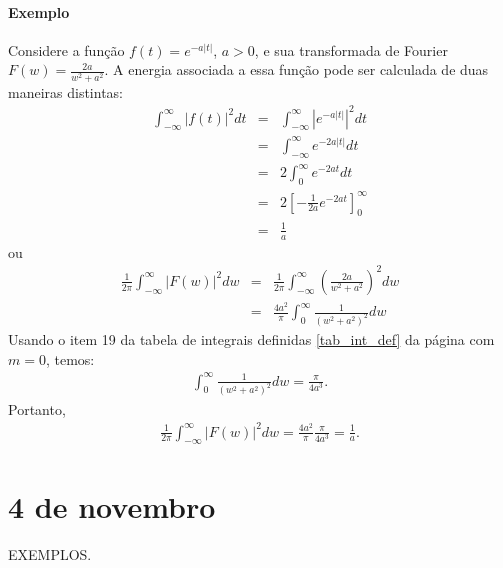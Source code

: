 \documentclass[a4paper,10pt]{book}
\begin{document}
\subsubsection{Exemplo}
Considere a função $f(t)=e^{-a|t|}$, $a>0$, e sua transformada de Fourier $F(w)=\frac{2a}{w^2+a^2}$. A energia associada a essa função pode ser calculada de duas maneiras distintas:
\begin{eqnarray*}
\int_{-\infty}^\infty |f(t)|^2dt&=&\int_{-\infty}^\infty |e^{-a|t|}|^2dt\\
&=&\int_{-\infty}^\infty e^{-2a|t|}dt\\
&=&2\int_{0}^\infty e^{-2a t}dt\\
&=&2\left[-\frac{1}{2a} e^{-2a t}\right]_{0}^\infty\\
&=&\frac{1}{a}
\end{eqnarray*}
ou
\begin{eqnarray*}
\frac{1}{2\pi}\int_{-\infty}^\infty |F(w)|^2dw&=&\frac{1}{2\pi}\int_{-\infty}^\infty \left(\frac{2a}{w^2+a^2}\right)^2dw\\
&=&\frac{4a^2}{\pi}\int_{0}^\infty \frac{1}{\left(w^2+a^2\right)^2}dw
\end{eqnarray*}
Usando o item 19 da tabela de integrais definidas \ref{tab_int_def} da página \pageref{tab_int_def} com $m=0$, temos:
\begin{eqnarray*}
\int_{0}^\infty \frac{1}{\left(w^2+a^2\right)^2}dw=\frac{\pi}{4a^3}.
\end{eqnarray*}
Portanto,
\begin{eqnarray*}
\frac{1}{2\pi}\int_{-\infty}^\infty |F(w)|^2dw=\frac{4a^2}{\pi}\frac{\pi}{4a^3}=\frac{1}{a}.
\end{eqnarray*}


\chapter{4 de novembro}

EXEMPLOS.
\end{document}
